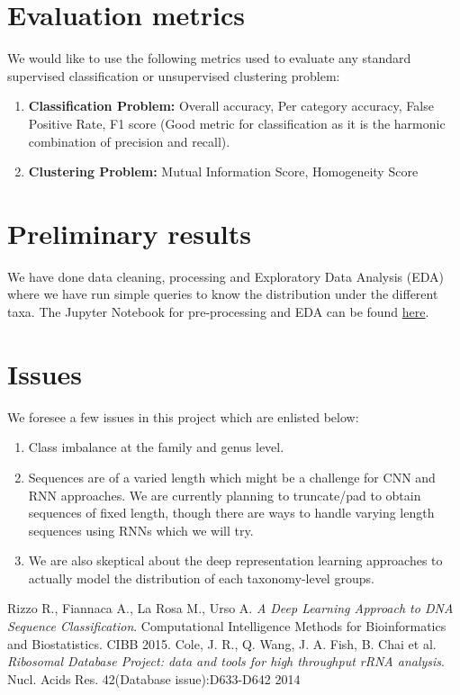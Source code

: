 \documentclass[12pt]{article}
\begin{document}
\section{Evaluation metrics}
We would like to use the following metrics used to evaluate any standard supervised classification or unsupervised clustering problem:
\begin{enumerate}
    \item \textbf{Classification Problem:} Overall accuracy, Per category accuracy, False Positive Rate, F1 score (Good metric for classification as it is the harmonic combination of precision and recall).
    \item \textbf{Clustering Problem:} Mutual Information Score, Homogeneity Score
\end{enumerate}

\section{Preliminary results}
We have done data cleaning, processing and Exploratory Data Analysis (EDA) where we have run simple queries to know the distribution under the different taxa. The Jupyter Notebook for pre-processing and EDA can be found {\color{blue}\href{https://nbviewer.jupyter.org/urls/dl.dropbox.com/s/862mx1q5jxsr5cl/EDA.ipynb}{here}}.

\section{Issues}
We foresee a few issues in this project which are enlisted below:
\begin{enumerate}
    \item Class imbalance at the family and genus level.
    \item Sequences are of a varied length which might be a challenge for CNN and RNN approaches. We are currently planning to truncate/pad to obtain sequences of fixed length, though there are ways to handle varying length sequences using RNNs which we will try.
    \item We are also skeptical about the deep representation learning approaches to actually model the distribution of each taxonomy-level groups.
\end{enumerate}

\begin{thebibliography}{9}
    Rizzo R., Fiannaca A., La Rosa M., Urso A.
    \textit{A Deep Learning Approach to DNA Sequence Classification}.
    Computational Intelligence Methods for Bioinformatics and Biostatistics. CIBB 2015.
    Cole, J. R., Q. Wang, J. A. Fish, B. Chai et al.
    \textit{Ribosomal Database Project: data and tools for high throughput rRNA analysis}.
    Nucl. Acids Res. 42(Database issue):D633-D642 2014
\end{thebibliography}
\end{document}
